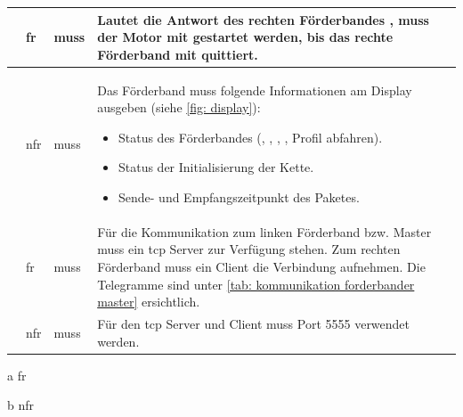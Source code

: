 \documentclass[./\jobname.tex]{subfiles}
\begin{document}
\begin{table}[H]
{\begin{threeparttable}
\begin{tabular}{Y{0.5cm}Y{0.75cm}Y{2.65cm}m{10cm}}
				 & \acrshort{fr} & muss & Lautet die Antwort des rechten Förderbandes \ready, muss der Motor mit \stepSizeMotor gestartet werden, bis das rechte Förderband mit \release quittiert.\\ \hline
				 & \acrshort{nfr} & muss & Das Förderband muss folgende Informationen am Display ausgeben (siehe \autoref{fig: display}):
				\begin{itemize}
					\item Status des Förderbandes (\wait, \release, \ready, \request, Profil abfahren).
					\item Status der Initialisierung der Kette.
					\item Sende- und Empfangszeitpunkt des Paketes.
				\end{itemize}
				\\ \hline
				 & \acrshort{fr} & muss & Für die Kommunikation zum linken Förderband bzw. Master muss ein \gls{tcp} Server zur Verfügung stehen. Zum rechten Förderband muss ein Client die Verbindung aufnehmen. Die Telegramme sind unter \autoref{tab: kommunikation forderbander master} ersichtlich. \\ \hline
				 & \acrshort{nfr} & muss & Für den \gls{tcp} Server und Client muss Port 5555 verwendet werden. \\ \hline
			\end{tabular}
			\label{tab: fr und nfr modeB}
			\begin{tablenotes}
				\footnotesize
				\item [a] \acrfull{fr}
				\item [b] \acrfull{nfr} 
			\end{tablenotes}
		\end{threeparttable}
	}
\end{table}
%
\end{document}
